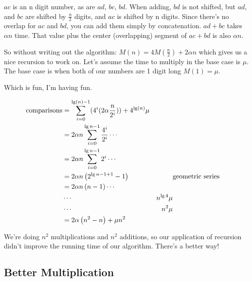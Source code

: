 \documentclass[english, 10pt]{article}
\begin{document}
$ac$ is an n digit number, as are $ad$, $bc$, $bd$. When adding, $bd$ is not shifted, but $ad$, and $bc$ are shifted by $\frac{n}{2}$ digits, and $ac$ is shifted by n digits.
Since there's no overlap for $ac$ and $bd$, you can add them simply by concatenation.
$ad + bc$ takes $\alpha n$ time. That value plus the center (overlapping) segment of $ac+bd$ is also $\alpha n$.


So without writing out the algorithm: $M(n) = 4M\left( \frac{n}{2} \right)+2\alpha n$ which gives us a nice recursion to work on. Let's assume the time to multiply in the base case is $\mu$. The base case is when both of our numbers are 1 digit long $M(1) = \mu$.


Which is fun, I'm having fun.

\begin{align*}
    \text{comparisons} &= \sum_{i=0}^{\lg(n)-1} (4^i (2\alpha\frac{n}{2^i}) ) + 4^{\lg(n)}\mu \\
    &=2\alpha n \sum_{i=0}^{\lg n-1}\frac{4^i}{2^i} \cdots\\
    &=2\alpha n \sum_{i=0}^{\lg n-1}{2^i} \cdots\\
    &=2\alpha n \left( 2^{\lg n -1 +1} -1 \right) & & \text{geometric series} \\
    &=2\alpha n \left( n-1 \right) \cdots\\
    &\cdots & n^{\lg 4} \mu \\
    &\cdots & n^2 \mu \\
    &= 2\alpha \left( n^2 -n \right)+\mu n^2
\end{align*}

We're doing $n^2$ multiplications and $n^2$ additions, so our application of
recursion didn't improve the running time of our algorithm. There's a better
way!

\subsection{Better Multiplication}
\end{document}
